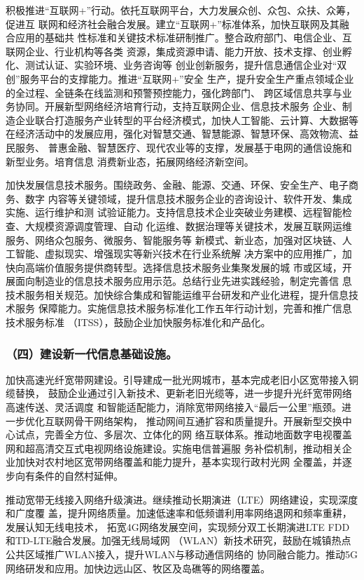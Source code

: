 \documentclass[11pt]{ctexart}
\begin{document}
{{{{积极推进“互联网+”行动。依托互联网平台，大力发展众创、众包、众扶、众筹，促进互
联网和经济社会融合发展。建立“互联网+”标准体系，加快互联网及其融合应用的基础共
性标准和关键技术标准研制推广。整合政府部门、电信企业、互联网企业、行业机构等各类
资源，集成资源申请、能力开放、技术支撑、创业孵化、测试认证、实验环境、业务咨询等
创业创新服务，提升信息通信企业对“双创”服务平台的支撑能力。推进“互联网+”安全
生产，提升安全生产重点领域企业的全过程、全链条在线监测和预警预控能力，强化跨部门、
跨区域信息共享与业务协同。开展新型网络经济培育行动，支持互联网企业、信息技术服务
企业、制造企业联合打造服务产业转型的平台经济模式，加快人工智能、云计算、大数据等
在经济活动中的发展应用，强化对智慧交通、智慧能源、智慧环保、高效物流、益民服务、
普惠金融、智慧医疗、现代农业等的支撑，发展基于电网的通信设施和新型业务。培育信息
消费新业态，拓展网络经济新空间。

加快发展信息技术服务。围绕政务、金融、能源、交通、环保、安全生产、电子商务、数字
内容等关键领域，提升信息技术服务企业的咨询设计、软件开发、集成实施、运行维护和测
试验证能力。支持信息技术企业突破业务建模、远程智能检查、大规模资源调度管理、自动
化运维、数据治理等关键技术，发展互联网运维服务、网络众包服务、微服务、智能服务等
新模式、新业态，加强对区块链、人工智能、虚拟现实、增强现实等新兴技术在行业系统解
决方案中的应用推广，加快向高端价值服务提供商转型。选择信息技术服务业集聚发展的城
市或区域，开展面向制造业的信息技术服务应用示范。总结行业先进实践经验，制定完善信
息技术服务相关规范。加快综合集成和智能运维平台研发和产业化进程，提升信息技术服务
保障能力。实施信息技术服务标准化工作五年行动计划，完善和推广信息技术服务标准
（ITSS），鼓励企业加快服务标准化和产品化。

\subsubsection{（四）建设新一代信息基础设施。}
\label{sec:org0e13eaa}

加快高速光纤宽带网建设。引导建成一批光网城市，基本完成老旧小区宽带接入铜缆替换，
鼓励企业通过引入新技术、更新老旧光缆等，进一步提升光纤宽带网络高速传送、灵活调度
和智能适配能力，消除宽带网络接入“最后一公里”瓶颈。进一步优化互联网骨干网络架构，
推动网间互通扩容和质量提升。开展新型交换中心试点，完善全方位、多层次、立体化的网
络互联体系。推动地面数字电视覆盖网和超高清交互式电视网络设施建设。实施电信普遍服
务补偿机制，推动相关企业加快对农村地区宽带网络覆盖和能力提升，基本实现行政村光网
全覆盖，并逐步向有条件的自然村延伸。

推动宽带无线接入网络升级演进。继续推动长期演进（LTE）网络建设，实现深度和广度覆
盖，提升网络质量。加速低速率和低频谱利用率网络退网和频率重耕，发展认知无线电技术，
拓宽4G网络发展空间，实现频分双工长期演进LTE FDD和TD-LTE融合发展。加强无线局域网
（WLAN）新技术研究，鼓励在城镇热点公共区域推广WLAN接入，提升WLAN与移动通信网络的
协同融合能力。推动5G网络研发和应用。加快边远山区、牧区及岛礁等的网络覆盖。

}}}}
\end{document}
